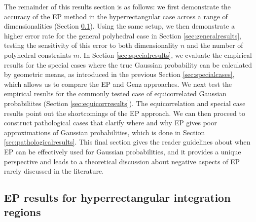 \documentclass[twoside,11pt]{article}
\begin{document}
The remainder of this results section is as follows:  we first demonstrate the accuracy of the EP method in the hyperrectangular case across a range of dimensionalities (Section \ref{sec:axisresults}).  Using the same setup, we then demonstrate a higher error rate for the general polyhedral case in Section \ref{sec:generalresults}, testing the sensitivity of this error to both dimensionality $n$  and the number of polyhedral constraints $m$.  In Section \ref{sec:specialresults}, we evaluate the empirical results for the special cases where the true Gaussian probability can be calculated by geometric means, as introduced in the previous Section \ref{sec:specialcases}, which allows us to compare the EP and Genz approaches.  We next test the empirical results for the commonly tested case of equicorrelated Gaussian probabiliites (Section \ref{sec:equicorrresults}).  The equicorrelation and special case results point out the shortcomings of the EP approach.  We can then proceed to construct pathological cases that clarify where and why EP gives poor approximations of Gaussian probabilities, which is done in Section \ref{sec:pathologicalresults}.  This final section gives the reader guidelines about when EP can be effectively used for Gaussian probabilities, and it provides a unique perspective and leads to a theoretical discussion about negative aspects of EP rarely discussed in the literature.


\subsection{EP results for hyperrectangular integration regions}
\label{sec:axisresults}
\end{document}
